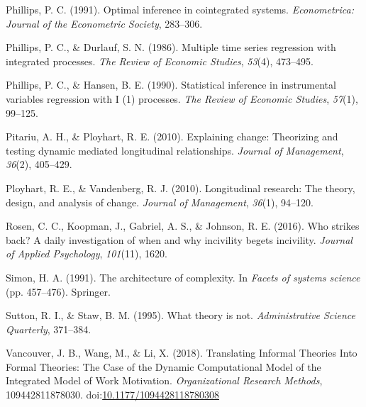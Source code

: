 \documentclass[english,,man]{apa6}
\theoremstyle{definition}
\theoremstyle{definition}
\theoremstyle{definition}
\theoremstyle{remark}
\begin{document}
\leavevmode\hypertarget{ref-phillips_optimal_1991}{}%
Phillips, P. C. (1991). Optimal inference in cointegrated systems.
\emph{Econometrica: Journal of the Econometric Society}, 283--306.

\leavevmode\hypertarget{ref-phillips_multiple_1986}{}%
Phillips, P. C., \& Durlauf, S. N. (1986). Multiple time series
regression with integrated processes. \emph{The Review of Economic
Studies}, \emph{53}(4), 473--495.

\leavevmode\hypertarget{ref-phillips_statistical_1990}{}%
Phillips, P. C., \& Hansen, B. E. (1990). Statistical inference in
instrumental variables regression with I (1) processes. \emph{The Review
of Economic Studies}, \emph{57}(1), 99--125.

\leavevmode\hypertarget{ref-pitariu_explaining_2010}{}%
Pitariu, A. H., \& Ployhart, R. E. (2010). Explaining change: Theorizing
and testing dynamic mediated longitudinal relationships. \emph{Journal
of Management}, \emph{36}(2), 405--429.

\leavevmode\hypertarget{ref-ployhart_longitudinal_2010}{}%
Ployhart, R. E., \& Vandenberg, R. J. (2010). Longitudinal research: The
theory, design, and analysis of change. \emph{Journal of Management},
\emph{36}(1), 94--120.

\leavevmode\hypertarget{ref-rosen_who_2016}{}%
Rosen, C. C., Koopman, J., Gabriel, A. S., \& Johnson, R. E. (2016). Who
strikes back? A daily investigation of when and why incivility begets
incivility. \emph{Journal of Applied Psychology}, \emph{101}(11), 1620.

\leavevmode\hypertarget{ref-simon1991architecture}{}%
Simon, H. A. (1991). The architecture of complexity. In \emph{Facets of
systems science} (pp. 457--476). Springer.

\leavevmode\hypertarget{ref-sutton1995theory}{}%
Sutton, R. I., \& Staw, B. M. (1995). What theory is not.
\emph{Administrative Science Quarterly}, 371--384.

\leavevmode\hypertarget{ref-vancouver_translating_2018}{}%
Vancouver, J. B., Wang, M., \& Li, X. (2018). Translating Informal
Theories Into Formal Theories: The Case of the Dynamic Computational
Model of the Integrated Model of Work Motivation. \emph{Organizational
Research Methods}, 109442811878030.
doi:\href{https://doi.org/10.1177/1094428118780308}{10.1177/1094428118780308}
\end{document}
